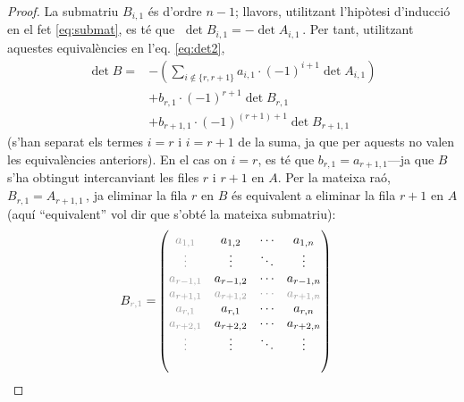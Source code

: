 \begin{lema}
\begin{proof}
		La submatriu $B_{i,1}$ és d'ordre $n-1$; llavors, utilitzant l'hipòtesi d'inducció en el fet \eqref{eq:submat}, es té que $\;\det B_{i,1} = - \det A_{i,1}\,$. Per tant, utilitzant aquestes equivalències en l'eq. \eqref{eq:det2},
		\begin{equation}\label{eq:dev1}
			\begin{split}
				\det B =& 	-\left(\sum_{i\notin \{r, r+1\}} a_{i,1}\cdot(-1)^{i+1}\det A_{i,1}\right)\\
				&	+ b_{r,1}\cdot(-1)^{r+1}\det B_{r,1}\\
				&	+ b_{r+1,1}\cdot(-1)^{(r+1)+1}\det B_{r+1,1}\,
			\end{split}
		\end{equation}
		(s'han separat els termes $i=r$ i $i=r+1$ de la suma, ja que per aquests no valen les equivalències anteriors).
		En el cas on $i = r$, es té que $b_{r,1} = a_{r+1,1}$---ja que $B$ s'ha obtingut intercanviant les files $r$ i $r+1$ en $A$. Per la mateixa raó, $B_{r,1} = A_{r+1, 1}\,$, ja eliminar la fila $r$ en $B$ és equivalent a eliminar la fila $r+1$ en $A$ (aquí ``equivalent'' vol dir que s'obté la mateixa submatriu):
		\begin{alignat*}{2}
			B_{\color[gray]{0.6}r,1} = &
			\begin{pmatrix}
			\color[gray]{0.6}
			a_{1,1}                     & a_{1,2}                    & \cdots                   & a_{1,n}                    \\
			\color[gray]{0.6}
			\vdots                      & \vdots                     & \ddots                   & \vdots                     \\
			\color[gray]{0.6}
			a_{r-1,1}                   & a_{r-1,2}                  & \cdots                   & a_{r-1,n}                  \\
			\color[gray]{0.6}
			a_{r+1,1}                   & \color[gray]{0.6}a_{r+1,2} & \color[gray]{0.6}	\cdots & \color[gray]{0.6}a_{r+1,n} \\
			\color[gray]{0.6}
			a_{r,1}                     & a_{r,1}                    & \cdots                   & a_{r,n}                    \\
			\color[gray]{0.6}
			a_{r+2,1}                   & a_{r+2,2}                  & \cdots                   & a_{r+2,n}                  \\
			\color[gray]{0.6}
			\vdots                      & \vdots                     & \ddots                   & \vdots                     \\
			\color[gray]{0.6}

\end{pmatrix}
\end{alignat*}
\end{proof}
\end{lema}
